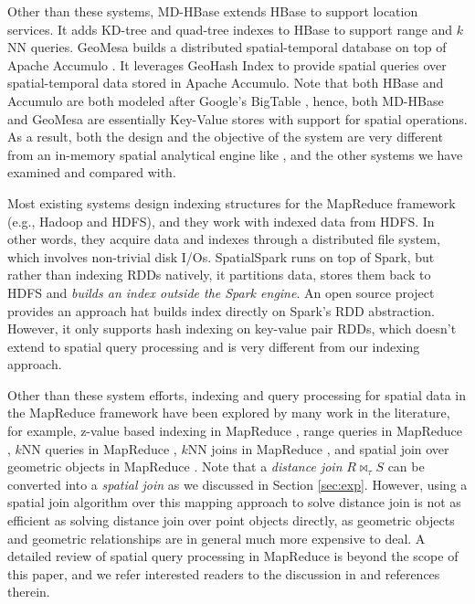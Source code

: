 Other than these systems, MD-HBase \cite{mdhbase} extends HBase to
support location services. It adds KD-tree and quad-tree indexes to
HBase to support range and $k$NN queries. GeoMesa \cite{geomesa}
builds a distributed spatial-temporal database on top of Apache
Accumulo \cite{accumulo}. It leverages GeoHash Index to provide
spatial queries over spatial-temporal data stored in Apache
Accumulo. Note that both HBase and Accumulo are both modeled after
Google's BigTable \cite{DBLP:journals/tocs/ChangDGHWBCFG08}, hence,
both MD-HBase and GeoMesa are essentially Key-Value stores with
support for spatial operations. As a result, both the design and the
objective of the system are very different from an in-memory spatial
analytical engine like \name, and the other systems we have examined
and compared with.

Most existing systems design indexing structures for the MapReduce
framework (e.g., Hadoop and HDFS), and they work with indexed data
from HDFS. In other words, they acquire data and indexes through a
distributed file system, which involves non-trivial disk
I/Os. SpatialSpark \cite{spatialspark} runs on top of Spark, but
rather than indexing RDDs natively, it partitions data, stores them
back to HDFS and {\em builds an index outside the Spark engine}.  An
open source project \cite{indexedrdd} provides an approach hat builds
index directly on Spark's RDD abstraction. However, it only supports
hash indexing on key-value pair RDDs, which doesn't extend to spatial
query processing and is very different from our indexing approach.

Other than these system efforts, indexing and query processing for
spatial data in the MapReduce framework have been explored by many
work in the literature, for example, z-value based indexing in
MapReduce \cite{cary2009experiences}, range queries in MapReduce
\cite{ma2009query, zhang2009spatial}, $k$NN queries in MapReduce
\cite{zhang2009spatial, akdogan2010voronoi}, $k$NN joins in MapReduce
\cite{feifeiknnj,bcknnj}, and spatial join over geometric objects in
MapReduce \cite{SJMR}. %
Note that a {\em distance join} $R \Join_{\tau} S$ can be converted
into a {\em spatial join} as we discussed in Section
\ref{sec:exp}. However, using a spatial join algorithm over this
mapping approach to solve distance join is not as efficient as solving
distance join over point objects directly, as geometric objects and
geometric relationships are in general much more expensive to deal. A
detailed review of spatial query processing in MapReduce is beyond the
scope of this paper, and we refer interested readers to the discussion
in \cite{spatialhadoop, hadoopgis} and references therein.

